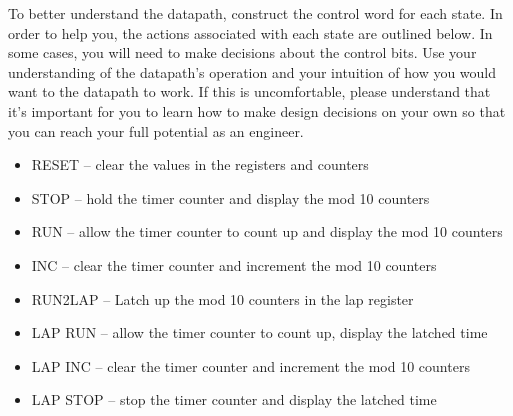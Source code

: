 To better understand the datapath, construct the control word for each
state. In order to help you, the actions associated with each state are
outlined below. In some cases, you will need to make decisions about the
control bits. Use your understanding of the datapath's operation and
your intuition of how you would want to the datapath to work. If this is
uncomfortable, please understand that it's important for you to learn
how to make design decisions on your own so that you can reach your full
potential as an engineer.

\begin{itemize}
    \item
        RESET -- clear the values in the registers and counters
    \item
        STOP -- hold the timer counter and display the mod 10 counters
    \item
        RUN -- allow the timer counter to count up and display the mod 10
        counters
    \item
        INC -- clear the timer counter and increment the mod 10 counters
    \item
        RUN2LAP -- Latch up the mod 10 counters in the lap register
    \item
        LAP RUN -- allow the timer counter to count up, display the latched
        time
    \item
        LAP INC -- clear the timer counter and increment the mod 10 counters
    \item
        LAP STOP -- stop the timer counter and display the latched time
\end{itemize}

